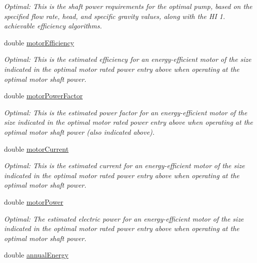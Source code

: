 \begin{DoxyCompactItemize}
\begin{DoxyCompactList}\small\item\em Optimal\+: This is the shaft power requirements for the optimal pump, based on the specified flow rate, head, and specific gravity values, along with the HI 1. achievable efficiency algorithms. \end{DoxyCompactList}\item 
double \hyperlink{struct_p_s_a_t_result_1_1result_a92baef08397dc269c233663deeaf6552}{motor\+Efficiency}
\begin{DoxyCompactList}\small\item\em Optimal\+: This is the estimated efficiency for an energy-\/efficient motor of the size indicated in the optimal motor rated power entry above when operating at the optimal motor shaft power. \end{DoxyCompactList}\item 
double \hyperlink{struct_p_s_a_t_result_1_1result_adf9772ebbf9b68a436fbbf75208027b8}{motor\+Power\+Factor}
\begin{DoxyCompactList}\small\item\em Optimal\+: This is the estimated power factor for an energy-\/efficient motor of the size indicated in the optimal motor rated power entry above when operating at the optimal motor shaft power (also indicated above). \end{DoxyCompactList}\item 
double \hyperlink{struct_p_s_a_t_result_1_1result_a1383694c94d04084421e0bd3f3c72af7}{motor\+Current}
\begin{DoxyCompactList}\small\item\em Optimal\+: This is the estimated current for an energy-\/efficient motor of the size indicated in the optimal motor rated power entry above when operating at the optimal motor shaft power. \end{DoxyCompactList}\item 
double \hyperlink{struct_p_s_a_t_result_1_1result_aa51d5a36cf45d9ac779ae395527a81f8}{motor\+Power}
\begin{DoxyCompactList}\small\item\em Optimal\+: The estimated electric power for an energy-\/efficient motor of the size indicated in the optimal motor rated power entry above when operating at the optimal motor shaft power. \end{DoxyCompactList}\item 
double \hyperlink{struct_p_s_a_t_result_1_1result_a0aeab028f0a7cf0ae1cc968161be4a97}{annual\+Energy}

\end{DoxyCompactItemize}
